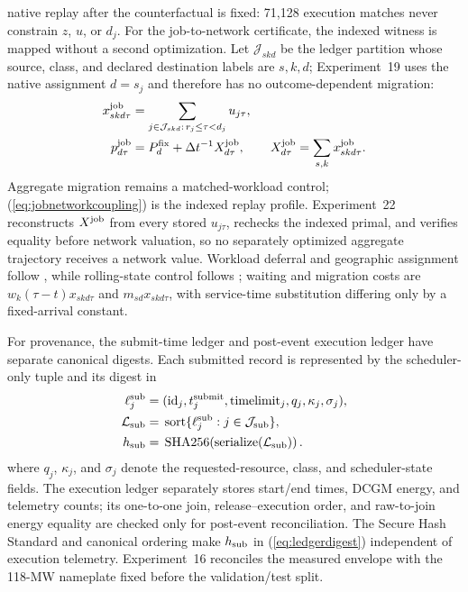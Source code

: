 \documentclass[10pt,journal]{IEEEtran}
\newcommand{\dt}{\Delta t}
\begin{document}
native replay after the counterfactual is fixed: 71,128 execution matches
never constrain \(z\), \(u\), or \(d_j\).
For the job-to-network certificate, the indexed witness is mapped without a
second optimization. Let $\mathcal J_{skd}$ be the ledger partition whose
source, class, and declared destination labels are $s,k,d$; Experiment~19
uses the native assignment $d=s_j$ and therefore has no outcome-dependent
migration:
\begin{align}
 x^{\rm job}_{skd\tau}&=\sum_{j\in\mathcal J_{skd}:\,r_j\leq\tau<d_j}
 u_{j\tau},\\
 p^{\rm job}_{d\tau}&=P_d^{\rm fix}+\dt^{-1}X^{\rm job}_{d\tau},\qquad
 X^{\rm job}_{d\tau}=\sum_{s,k}x^{\rm job}_{skd\tau}.
 \label{eq:jobnetworkcoupling}
\end{align}
Aggregate migration remains a matched-workload control; (\ref{eq:jobnetworkcoupling})
is the indexed replay profile. Experiment~22 reconstructs $X^{\rm job}$ from
every stored $u_{j\tau}$, rechecks the indexed primal, and verifies equality
before network valuation, so no
separately optimized aggregate trajectory receives a network value. Workload
deferral and geographic assignment follow
\cite{cao2022flexibility,cao2024nonwire}, while rolling-state control follows
\cite{zhang2023receding}; waiting and
migration costs are $w_k(\tau-t)x_{skd\tau}$ and $m_{sd}x_{skd\tau}$, with
service-time substitution differing only by a fixed-arrival constant.

For provenance, the submit-time ledger and post-event execution ledger have
separate canonical digests. Each submitted record is represented by the
scheduler-only tuple and its digest in
\begin{equation}
\begin{aligned}
 \ell_j^{\rm sub}={}&(\mathrm{id}_j,t_j^{\rm submit},\mathrm{timelimit}_j,
 q_j,\kappa_j,\sigma_j),\\
 \mathcal L_{\rm sub}={}&\operatorname{sort}\{\ell_j^{\rm sub}:j\in\mathcal J_{\rm sub}\},\\
 h_{\rm sub}={}&\operatorname{SHA256}\!\left(\operatorname{serialize}(\mathcal L_{\rm sub})\right).
\end{aligned}
\label{eq:ledgerdigest}
\end{equation}
where $q_j$, $\kappa_j$, and $\sigma_j$ denote the requested-resource,
class, and scheduler-state fields. The execution ledger separately stores
start/end times, DCGM energy, and telemetry counts; its one-to-one join,
release--execution order, and raw-to-join energy equality are checked only for
post-event reconciliation. The Secure Hash Standard
\cite{nist2015fips1804} and canonical ordering make $h_{\rm sub}$ in
(\ref{eq:ledgerdigest}) independent of execution telemetry. Experiment~16 reconciles the measured envelope with
the 118-MW nameplate fixed before the validation/test split.
\end{document}
